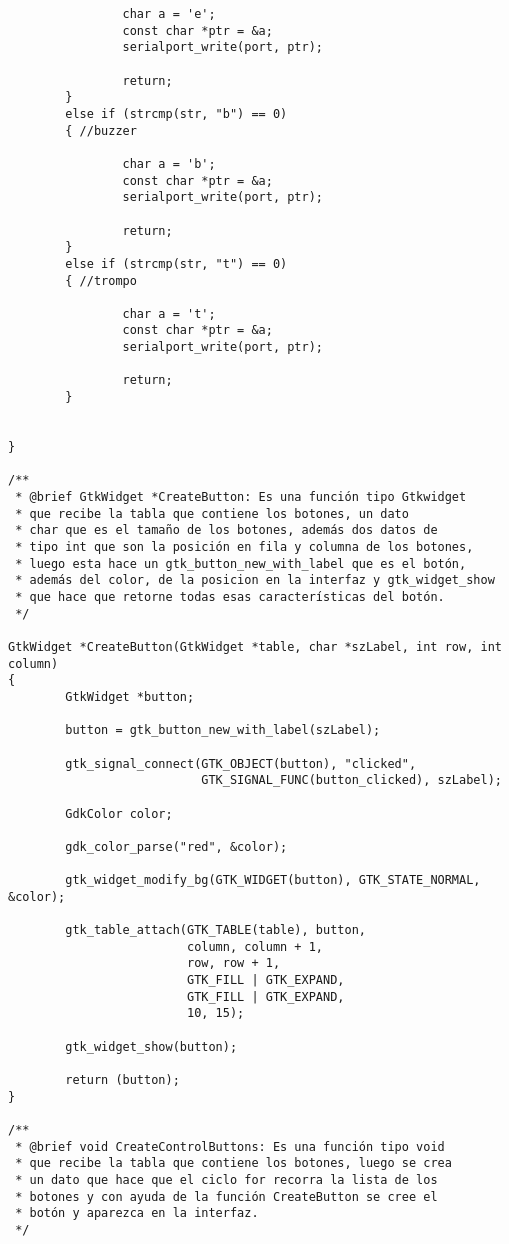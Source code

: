 \begin{lstlisting}
                char a = 'e';
                const char *ptr = &a;
                serialport_write(port, ptr);

                return;
        }
        else if (strcmp(str, "b") == 0)
        { //buzzer

                char a = 'b';
                const char *ptr = &a;
                serialport_write(port, ptr);

                return;
        }
        else if (strcmp(str, "t") == 0)
        { //trompo

                char a = 't';
                const char *ptr = &a;
                serialport_write(port, ptr);

                return;
        }


}

/**
 * @brief GtkWidget *CreateButton: Es una función tipo Gtkwidget
 * que recibe la tabla que contiene los botones, un dato
 * char que es el tamaño de los botones, además dos datos de
 * tipo int que son la posición en fila y columna de los botones,
 * luego esta hace un gtk_button_new_with_label que es el botón,
 * además del color, de la posicion en la interfaz y gtk_widget_show
 * que hace que retorne todas esas características del botón.
 */

GtkWidget *CreateButton(GtkWidget *table, char *szLabel, int row, int column)
{
        GtkWidget *button;

        button = gtk_button_new_with_label(szLabel);

        gtk_signal_connect(GTK_OBJECT(button), "clicked",
                           GTK_SIGNAL_FUNC(button_clicked), szLabel);

        GdkColor color;

        gdk_color_parse("red", &color);

        gtk_widget_modify_bg(GTK_WIDGET(button), GTK_STATE_NORMAL, &color);

        gtk_table_attach(GTK_TABLE(table), button,
                         column, column + 1,
                         row, row + 1,
                         GTK_FILL | GTK_EXPAND,
                         GTK_FILL | GTK_EXPAND,
                         10, 15);

        gtk_widget_show(button);

        return (button);
}

/**
 * @brief void CreateControlButtons: Es una función tipo void
 * que recibe la tabla que contiene los botones, luego se crea
 * un dato que hace que el ciclo for recorra la lista de los
 * botones y con ayuda de la función CreateButton se cree el
 * botón y aparezca en la interfaz.
 */


\end{lstlisting}
